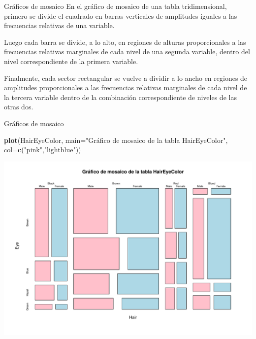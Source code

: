 \documentclass[
  ignorenonframetext,
]{beamer}
\newenvironment{Shaded}{\begin{snugshade}}{\end{snugshade}}
\newcommand{\AttributeTok}[1]{\textcolor[rgb]{0.13,0.29,0.53}{#1}}
\newcommand{\FunctionTok}[1]{\textcolor[rgb]{0.13,0.29,0.53}{\textbf{#1}}}
\newcommand{\NormalTok}[1]{#1}
\newcommand{\StringTok}[1]{\textcolor[rgb]{0.31,0.60,0.02}{#1}}
\begin{document}
\begin{frame}{Gráficos de mosaico}
\label{gruxe1ficos-de-mosaico-2}
En el gráfico de mosaico de una tabla tridimensional, primero se divide
el cuadrado en barras verticales de amplitudes iguales a las frecuencias
relativas de una variable.

Luego cada barra se divide, a lo alto, en regiones de alturas
proporcionales a las frecuencias relativas marginales de cada nivel de
una segunda variable, dentro del nivel correspondiente de la primera
variable.

Finalmente, cada sector rectangular se vuelve a dividir a lo ancho en
regiones de amplitudes proporcionales a las frecuencias relativas
marginales de cada nivel de la tercera variable dentro de la combinación
correspondiente de niveles de las otras dos.
\end{frame}

\begin{frame}[fragile]{Gráficos de mosaico}
\label{gruxe1ficos-de-mosaico-3}
\begin{Shaded}
\begin{Highlighting}[]
\FunctionTok{plot}\NormalTok{(HairEyeColor, }\AttributeTok{main=}\StringTok{"Gráfico de mosaico de la tabla HairEyeColor"}\NormalTok{, }
     \AttributeTok{col=}\FunctionTok{c}\NormalTok{(}\StringTok{"pink"}\NormalTok{,}\StringTok{"lightblue"}\NormalTok{))}
\end{Highlighting}
\end{Shaded}

\includegraphics{R_base_files/figure-beamer/unnamed-chunk-95-1.pdf}
\end{frame}
\end{document}
